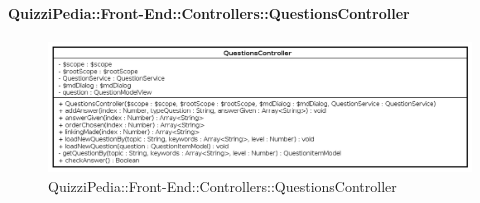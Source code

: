 \paragraph{QuizziPedia::Front-End::Controllers::QuestionsController}
\begin{figure} [ht]
	\centering
	\includegraphics[scale=0.45]{UML/Classi/Front-End/QuizziPedia_Front-end_Controller_QuestionsController.png}
	\caption{QuizziPedia::Front-End::Controllers::QuestionsController}
\end{figure} \FloatBarrier
